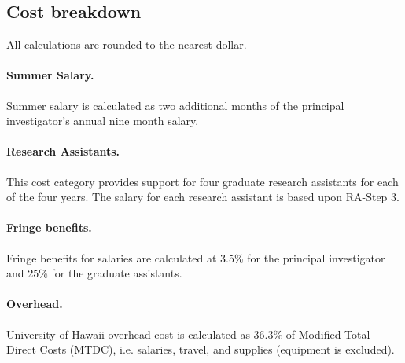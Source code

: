 \subsection*{Cost breakdown}
\label{cost-breakdown}

All calculations are rounded to the nearest dollar.

\paragraph{Summer Salary.}  
Summer salary is calculated as two additional months of the principal
investigator's annual nine month salary.   

\paragraph*{Research Assistants.}  
This cost category provides support for four graduate research assistants
for each of the four years.  The salary for each research assistant is
based upon RA-Step 3.

\paragraph*{Fringe benefits.} 
Fringe benefits for salaries are calculated at 3.5\% for the principal
investigator and 25\% for the graduate assistants.

\paragraph*{Overhead.}  
University of Hawaii overhead cost is calculated as 36.3\% of Modified Total
Direct Costs (MTDC), i.e. salaries, travel, and supplies (equipment is
excluded).





